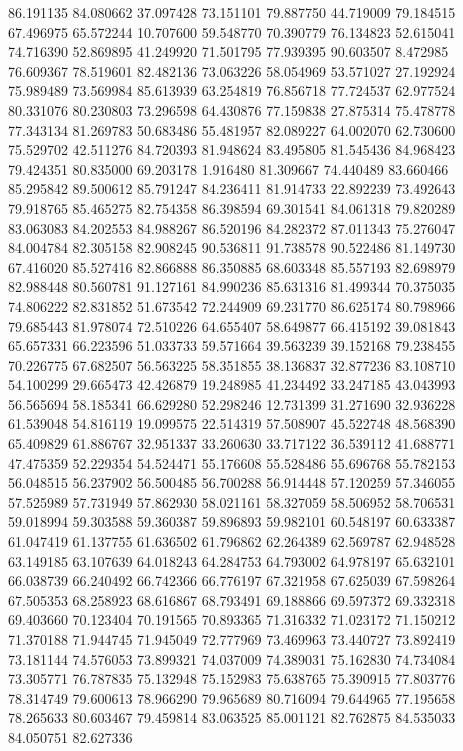 86.191135
84.080662
37.097428
73.151101
79.887750
44.719009
79.184515
67.496975
65.572244
10.707600
59.548770
70.390779
76.134823
52.615041
74.716390
52.869895
41.249920
71.501795
77.939395
90.603507
8.472985
76.609367
78.519601
82.482136
73.063226
58.054969
53.571027
27.192924
75.989489
73.569984
85.613939
63.254819
76.856718
77.724537
62.977524
80.331076
80.230803
73.296598
64.430876
77.159838
27.875314
75.478778
77.343134
81.269783
50.683486
55.481957
82.089227
64.002070
62.730600
75.529702
42.511276
84.720393
81.948624
83.495805
81.545436
84.968423
79.424351
80.835000
69.203178
1.916480
81.309667
74.440489
83.660466
85.295842
89.500612
85.791247
84.236411
81.914733
22.892239
73.492643
79.918765
85.465275
82.754358
86.398594
69.301541
84.061318
79.820289
83.063083
84.202553
84.988267
86.520196
84.282372
87.011343
75.276047
84.004784
82.305158
82.908245
90.536811
91.738578
90.522486
81.149730
67.416020
85.527416
82.866888
86.350885
68.603348
85.557193
82.698979
82.988448
80.560781
91.127161
84.990236
85.631316
81.499344
70.375035
74.806222
82.831852
51.673542
72.244909
69.231770
86.625174
80.798966
79.685443
81.978074
72.510226
64.655407
58.649877
66.415192
39.081843
65.657331
66.223596
51.033733
59.571664
39.563239
39.152168
79.238455
70.226775
67.682507
56.563225
58.351855
38.136837
32.877236
83.108710
54.100299
29.665473
42.426879
19.248985
41.234492
33.247185
43.043993
56.565694
58.185341
66.629280
52.298246
12.731399
31.271690
32.936228
61.539048
54.816119
19.099575
22.514319
57.508907
45.522748
48.568390
65.409829
61.886767
32.951337
33.260630
33.717122
36.539112
41.688771
47.475359
52.229354
54.524471
55.176608
55.528486
55.696768
55.782153
56.048515
56.237902
56.500485
56.700288
56.914448
57.120259
57.346055
57.525989
57.731949
57.862930
58.021161
58.327059
58.506952
58.706531
59.018994
59.303588
59.360387
59.896893
59.982101
60.548197
60.633387
61.047419
61.137755
61.636502
61.796862
62.264389
62.569787
62.948528
63.149185
63.107639
64.018243
64.284753
64.793002
64.978197
65.632101
66.038739
66.240492
66.742366
66.776197
67.321958
67.625039
67.598264
67.505353
68.258923
68.616867
68.793491
69.188866
69.597372
69.332318
69.403660
70.123404
70.191565
70.893365
71.316332
71.023172
71.150212
71.370188
71.944745
71.945049
72.777969
73.469963
73.440727
73.892419
73.181144
74.576053
73.899321
74.037009
74.389031
75.162830
74.734084
73.305771
76.787835
75.132948
75.152983
75.638765
75.390915
77.803776
78.314749
79.600613
78.966290
79.965689
80.716094
79.644965
77.195658
78.265633
80.603467
79.459814
83.063525
85.001121
82.762875
84.535033
84.050751
82.627336

